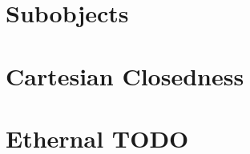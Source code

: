\documentclass[a4paper,12pt,fleqn]{scrartcl}  %
\begin{document}
\begin{appendices}
	

\section{Subobjects}


\section{Cartesian Closedness}



\section{Ethernal TODO}
	
	
	



\end{appendices}
			\nocite{*}
			
			
\end{document}
